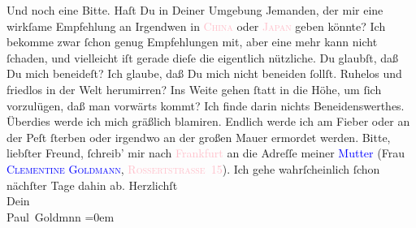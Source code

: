                Und noch eine Bitte. Haſt Du in Deiner Umgebung Jemanden, {\pb}der mir eine
               wirkſame Empfehlung an Irgendwen in \textsc{\textcolor{pink}{China}{}\ledrightnote{\textcolor{pink}{China}}} oder \textsc{\textcolor{pink}{Japan}{}\ledrightnote{\textcolor{pink}{Japan}}} geben könnte? Ich bekomme zwar ſchon genug Empfehlungen mit, aber eine mehr
               kann nicht ſchaden, und vielleicht iſt gerade dieſe die eigentlich\strikeout{\textcolor{gray}{e}} nützliche.\pend
           \pstart
           Du glaubſt, daß Du mich beneideſt? Ich glaube, daß Du mich nicht beneiden ſollſt.
               Ruhelos und friedlos in der Welt herumirren?  Ins Weite gehen ſtatt in die Höhe, um ſich
               vorzulügen, daß man {\pb}vorwärts kommt? Ich finde darin
               nichts Beneidenswerthes. Überdies werde ich mich gräßlich  blamiren. Endlich werde ich \strikeout{\textcolor{gray}{a}} am Fieber \introOben{}oder\introOben{} an der Peſt \strikeout{\textcolor{gray}{d}\textcolor{gray}{×}\textcolor{gray}{e}} ſterben oder irgendwo an der großen Mauer 
               ermordet werden.\pend
           \pstart
           Bitte, liebſter Freund, ſchreib’ mir nach \textcolor{pink}{Frankfurt}{}\ledrightnote{\textcolor{pink}{Frankfurt am Main}} an die Adreſſe meiner \textcolor{blue}{Mutter}{} (Frau \textsc{\textcolor{blue}{Clementine Goldmann}{}\ledrightnote{\textcolor{blue}{Clementine Goldmann}}}, \textcolor{pink}{\textsc{Rossertstraße} 15}{}\ledrightnote{\textcolor{pink}{Rossertstraße}}). Ich gehe wahrſcheinlich ſchon
               nächſter Tage dahin ab.\pend
           \pstart
           Herzlichſt {\\[\baselineskip]}Dein {\\[\baselineskip]}\spacefill\mbox{Paul Goldmnn}\pend
           \leftskip=0em{}\endnumbering{}  
      